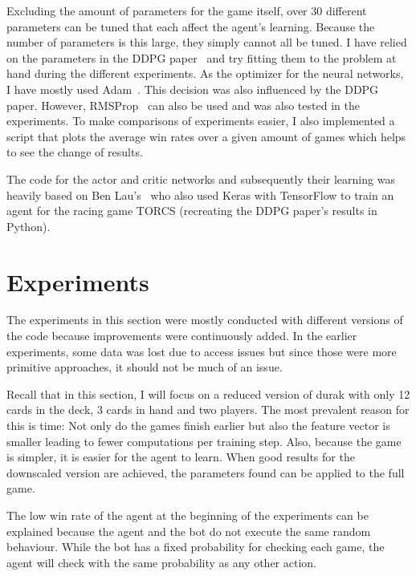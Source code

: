 \documentclass[a4paper,titlepage]{article}
\begin{document}
Excluding the amount of parameters for the game itself, over 30 different parameters can be tuned that each affect the agent's learning.
Because the number of parameters is this large, they simply cannot all be tuned. I have relied on the parameters in the DDPG paper~\cite[p.~11]{ddpg} and try fitting them to the problem at hand during the different experiments.
As the optimizer for the neural networks, I have mostly used Adam~\cite{adam}. This decision was also influenced by the DDPG paper. However, RMSProp~\cite{rmsprop} can also be used and was also tested in the experiments.
To make comparisons of experiments easier, I also implemented a script that plots the average win rates over a given amount of games which helps to see the change of results. \medskip

The code for the actor and critic networks and subsequently their learning was heavily based on Ben Lau's~\cite{torcs} who also used Keras with TensorFlow to train an agent for the racing game TORCS (recreating the DDPG paper's results in Python).

\newpage

\section{Experiments}

The experiments in this section were mostly conducted with different versions of the code because improvements were continuously added. In the earlier experiments, some data was lost due to access issues but since those were more primitive approaches, it should not be much of an issue.

Recall that in this section, I will focus on a reduced version of durak with only 12 cards in the deck, 3 cards in hand and two players. The most prevalent reason for this is time: Not only do the games finish earlier but also the feature vector is smaller leading to fewer computations per training step.
Also, because the game is simpler, it is easier for the agent to learn. When good results for the downscaled version are achieved, the parameters found can be applied to the full game.

The low win rate of the agent at the beginning of the experiments can be explained because the agent and the bot do not execute the same random behaviour. While the bot has a fixed probability for checking each game, the agent will check with the same probability as any other action.

\newpage
\end{document}
